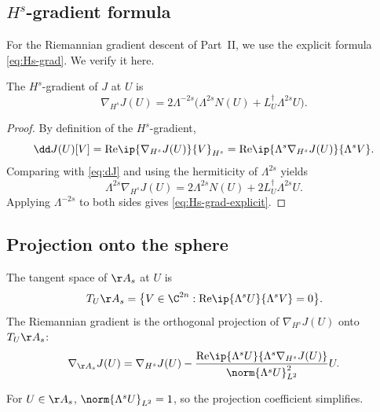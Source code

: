 \subsection{$H^s$-gradient formula}
\label{ssec:B-Hs-grad}

For the Riemannian gradient descent of Part~II, we use the explicit 
formula \eqref{eq:Hs-grad}. We verify it here.

\begin{proposition}[$H^s$-gradient]\label{prop:Hs-grad}
The $H^s$-gradient of $J$ at $U$ is
\begin{equation}\label{eq:Hs-grad-explicit}
\nabla_{H^s}J(U) = 2\Lambda^{-2s}\bigl(\Lambda^{2s}N(U) + 
L_U^\dagger\Lambda^{2s}U\bigr).
\end{equation}
\end{proposition}

\begin{proof}
By definition of the $H^s$-gradient,
\begin{equation*}
\dd J(U)[V] = \mathrm{Re}\ip{\nabla_{H^s}J(U)}{V}_{H^s} = 
\mathrm{Re}\ip{\Lambda^s\nabla_{H^s}J(U)}{\Lambda^s V}.
\end{equation*}
Comparing with \eqref{eq:dJ} and using the hermiticity of 
$\Lambda^{2s}$ yields
\begin{equation*}
\Lambda^{2s}\nabla_{H^s}J(U) = 2\Lambda^{2s}N(U) + 
2L_U^\dagger\Lambda^{2s}U.
\end{equation*}
Applying $\Lambda^{-2s}$ to both sides gives \eqref{eq:Hs-grad-explicit}.
\end{proof}

\subsection{Projection onto the sphere}
\label{ssec:B-projection}

The tangent space of $\AA_s$ at $U$ is
\begin{equation}\label{eq:tangent-appendix}
T_U\AA_s = \bigl\{V\in\C^{2n} : \mathrm{Re}\ip{\Lambda^s U}{\Lambda^s V}=0\bigr\}.
\end{equation}
The Riemannian gradient is the orthogonal projection of 
$\nabla_{H^s}J(U)$ onto $T_U\AA_s$:
\begin{equation}\label{eq:riemannian-grad}
\nabla_{\AA_s}J(U) = \nabla_{H^s}J(U) - 
\frac{\mathrm{Re}\ip{\Lambda^s U}{\Lambda^s\nabla_{H^s}J(U)}}
     {\norm{\Lambda^s U}_{L^2}^2}U.
\end{equation}

\begin{remark}[Consistency]\label{rem:proj-consistency}
For $U\in\AA_s$, $\norm{\Lambda^s U}_{L^2}=1$, so the projection 
coefficient simplifies.
\end{remark}

